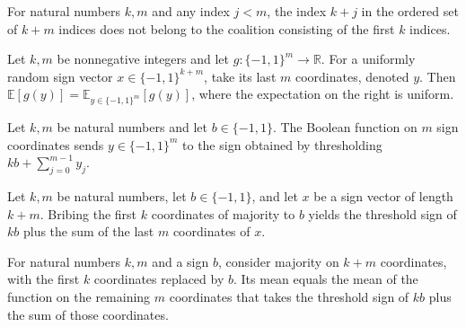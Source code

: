 \begin{theorem}
\label{FABL.not_mem_majorityHeadCoalition_natAdd}
\leanok
{}
For natural numbers $k,m$ and any index $j<m$, the index $k+j$ in the ordered set of
$k+m$ indices does not belong to the coalition consisting of the first $k$ indices.
\end{theorem}

\begin{theorem}
\label{FABL.expect_majorityCoalitionSplit_tail}
\leanok
{}
Let $k,m$ be nonnegative integers and let $g:\{-1,1\}^m\to\mathbb R$. For a
uniformly random sign vector $x\in\{-1,1\}^{k+m}$, take its last $m$ coordinates,
denoted $y$. Then $\mathbb E[g(y)]=\mathbb E_{y\in\{-1,1\}^m}[g(y)]$, where the
expectation on the right is uniform.
\end{theorem}

\begin{definition}
\label{FABL.majorityAfterHeadBribe}
\leanok
{}
Let $k,m$ be natural numbers and let $b\in\{ -1,1\}$. The Boolean function on $m$ sign
coordinates sends $y\in\{-1,1\}^{m}$ to the sign obtained by thresholding $k
b+\sum_{j=0}^{m-1}y_j$.
\end{definition}

\begin{theorem}
\label{FABL.bribeFunction_majority_head_apply}
\leanok
{}
Let $k,m$ be natural numbers, let $b\in\{-1,1\}$, and let $x$ be a sign vector of length
$k+m$. Bribing the first $k$ coordinates of majority to $b$ yields the threshold sign of
$kb$ plus the sum of the last $m$ coordinates of $x$.
\end{theorem}

\begin{theorem}
\label{FABL.mean_bribeFunction_majority_head}
\leanok
{}
For natural numbers $k,m$ and a sign $b$, consider majority on $k+m$ coordinates, with
the first $k$ coordinates replaced by $b$. Its mean equals the mean of the function on
the remaining $m$ coordinates that takes the threshold sign of $k b$ plus the sum of
those coordinates.
\end{theorem}

